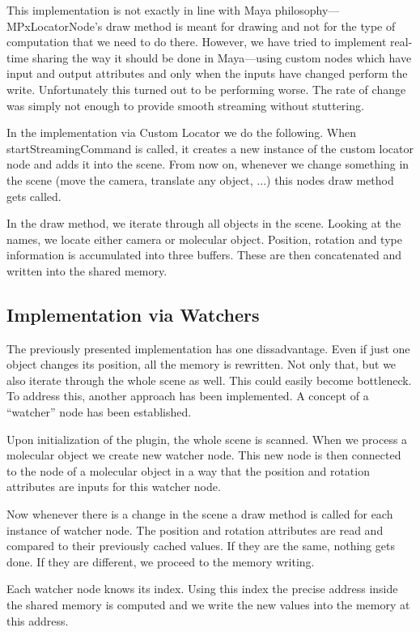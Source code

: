\documentclass[
  digital, %
  table,   %
  nolof,     %
  nolot,     %
]{fithesis3}
\begin{document}
This implementation is not exactly in line with Maya philosophy—MPxLocatorNode's draw method is meant for drawing and not for the type of computation that we need to do there. However, we have tried to implement real-time sharing the way it should be done in Maya—using custom nodes which have input and output attributes and only when the inputs have changed perform the write. Unfortunately this turned out to be performing worse. The rate of change was simply not enough to provide smooth streaming without stuttering.

In the implementation via Custom Locator we do the following. When startStreamingCommand is called, it creates a new instance of the custom locator node and adds it into the scene. From now on, whenever we change something in the scene (move the camera, translate any object, ...) this nodes draw method gets called.

In the draw method, we iterate through all objects in the scene. Looking at the names, we locate either camera or molecular object. Position, rotation and type information is accumulated into three buffers. These are then concatenated and written into the shared memory.

\subsection{Implementation via Watchers}
The previously presented implementation has one dissadvantage. Even if just one object changes its position, all the memory is rewritten. Not only that, but we also iterate through the whole scene as well. This could easily become bottleneck. To address this, another approach has been implemented. A concept of a ``watcher'' node has been established.

Upon initialization of the plugin, the whole scene is scanned. When we process a molecular object we create new watcher node. This new node is then connected to the node of a molecular object in a way that the position and rotation attributes are inputs for this watcher node.

Now whenever there is a change in the scene a draw method is called for each instance of watcher node. The position and rotation attributes are read and compared to their previously cached values. If they are the same, nothing gets done. If they are different, we proceed to the memory writing.

Each watcher node knows its index. Using this index the precise address inside the shared memory is computed and we write the new values into the memory at this address.
\end{document}
